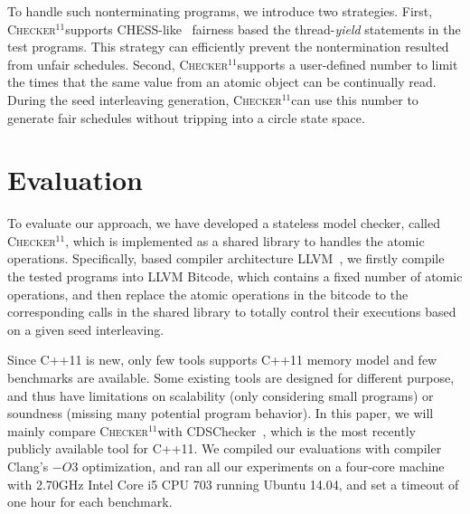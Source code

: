 \documentclass[preprint, numbers, 10pt]{sigplanconf}
\newcommand{\checker}{\textsc{Checker$^{11}$}}
\begin{document}
To handle such nonterminating programs, we introduce two strategies. 
First, \checker supports CHESS-like~\cite{Musuvathi:2008}
fairness based the thread-\textit{yield} statements in the test programs. 
This strategy can efficiently prevent the nontermination resulted from unfair schedules.
Second, \checker supports a user-defined number to limit the times that
the same value from an atomic object can be continually read. 
During the seed interleaving generation, \checker can use this number to 
generate fair schedules without tripping into a circle state space.

\section{Evaluation}

To evaluate our approach, we have developed a stateless model checker, called \checker,
which is implemented as a shared library to handles the 
atomic operations. Specifically, based compiler architecture LLVM~\cite{Lattner:2004}, we firstly compile
the tested programs into LLVM Bitcode, which contains a fixed number of atomic operations,
and then replace the atomic operations in the bitcode to the corresponding calls in the shared 
library to totally control their executions based on a given seed interleaving. 

Since C++11 is new, only few tools supports C++11 memory model and few benchmarks are available. 
Some existing tools are designed for different purpose, and thus have limitations on scalability 
(only considering small programs) or soundness (missing many potential program behavior). 
In this paper, we will mainly compare \checker with CDSChecker~\cite{Norris:2013}, which is the most
recently publicly available tool for C++11. 
We compiled our evaluations with compiler Clang's $-O3$ optimization, and ran all our experiments 
on a four-core machine with 2.70GHz Intel Core i5 CPU 703 running Ubuntu 14.04, 
and set a timeout of one hour for each benchmark.









\end{document}
